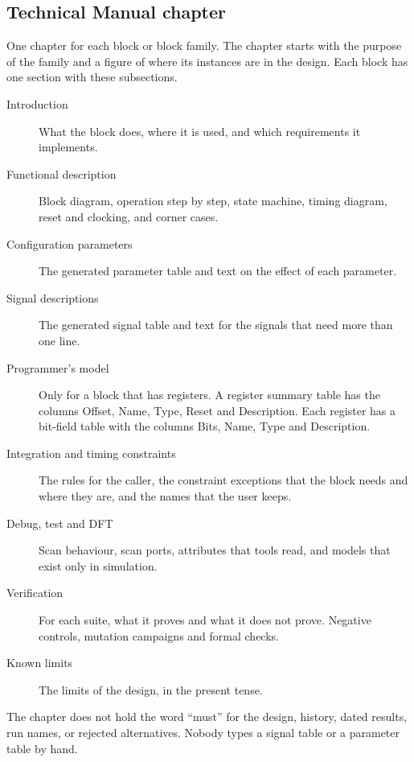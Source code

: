 \subsection{Technical Manual chapter}
One chapter for each block or block family. The chapter starts with the purpose of the family and a figure of where its instances are in the design. Each block has one section with these subsections.
\begin{description}
  \item[Introduction] What the block does, where it is used, and which requirements it implements.
  \item[Functional description] Block diagram, operation step by step, state machine, timing diagram, reset and clocking, and corner cases.
  \item[Configuration parameters] The generated parameter table and text on the effect of each parameter.
  \item[Signal descriptions] The generated signal table and text for the signals that need more than one line.
  \item[Programmer's model] Only for a block that has registers. A register summary table has the columns Offset, Name, Type, Reset and Description. Each register has a bit-field table with the columns Bits, Name, Type and Description.
  \item[Integration and timing constraints] The rules for the caller, the constraint exceptions that the block needs and where they are, and the names that the user keeps.
  \item[Debug, test and DFT] Scan behaviour, scan ports, attributes that tools read, and models that exist only in simulation.
  \item[Verification] For each suite, what it proves and what it does not prove. Negative controls, mutation campaigns and formal checks.
  \item[Known limits] The limits of the design, in the present tense.
\end{description}
The chapter does not hold the word ``must'' for the design, history, dated results, run names, or rejected alternatives. Nobody types a signal table or a parameter table by hand.

